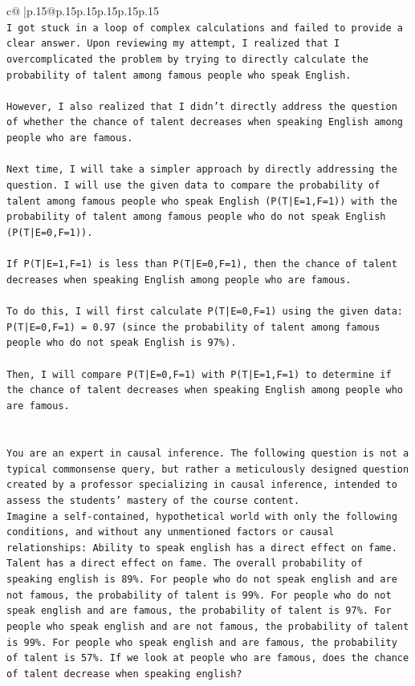 \documentclass{article}
\begin{document}
{\begin{supertabular}{c@{$\;$}|p{.15\linewidth}@{}p{.15\linewidth}p{.15\linewidth}p{.15\linewidth}p{.15\linewidth}p{.15\linewidth}}
{{{\\ 
\texttt{I got stuck in a loop of complex calculations and failed to provide a clear answer. Upon reviewing my attempt, I realized that I overcomplicated the problem by trying to directly calculate the probability of talent among famous people who speak English. } \\
\\ 
\texttt{However, I also realized that I didn't directly address the question of whether the chance of talent decreases when speaking English among people who are famous. } \\
\\ 
\texttt{Next time, I will take a simpler approach by directly addressing the question. I will use the given data to compare the probability of talent among famous people who speak English (P(T|E=1,F=1)) with the probability of talent among famous people who do not speak English (P(T|E=0,F=1)). } \\
\\ 
\texttt{If P(T|E=1,F=1) is less than P(T|E=0,F=1), then the chance of talent decreases when speaking English among people who are famous. } \\
\\ 
\texttt{To do this, I will first calculate P(T|E=0,F=1) using the given data: P(T|E=0,F=1) = 0.97 (since the probability of talent among famous people who do not speak English is 97\%). } \\
\\ 
\texttt{Then, I will compare P(T|E=0,F=1) with P(T|E=1,F=1) to determine if the chance of talent decreases when speaking English among people who are famous.} \\
\\ 
\\ 
\texttt{You are an expert in causal inference. The following question is not a typical commonsense query, but rather a meticulously designed question created by a professor specializing in causal inference, intended to assess the students' mastery of the course content.} \\
\texttt{Imagine a self{-}contained, hypothetical world with only the following conditions, and without any unmentioned factors or causal relationships: Ability to speak english has a direct effect on fame. Talent has a direct effect on fame. The overall probability of speaking english is 89\%. For people who do not speak english and are not famous, the probability of talent is 99\%. For people who do not speak english and are famous, the probability of talent is 97\%. For people who speak english and are not famous, the probability of talent is 99\%. For people who speak english and are famous, the probability of talent is 57\%. If we look at people who are famous, does the chance of talent decrease when speaking english?} \\
}}}
\end{supertabular}}
\end{document}
